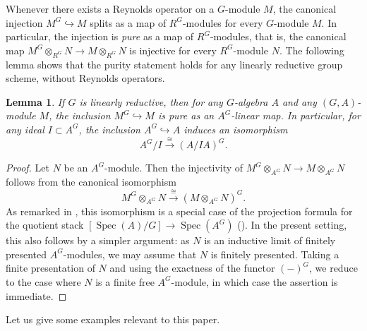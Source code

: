\documentclass[uplatex,11pt,a4paper]{amsart} %
\numberwithin{equation}{section}
\numberwithin{figure}{section}
\numberwithin{table}{section}
\theoremstyle{plain}
\newtheorem{lemma}[theorem]{Lemma}
\theoremstyle{definition}
\newcommand{\xr}{\xrightarrow}
\DeclareMathOperator{\Spec}{Spec}
\begin{document}
Whenever there exists a Reynolds operator on a $G$-module $M$, the canonical injection $M^G\hookrightarrow M$ splits as a map of $R^G$-modules for every $G$-module $M$. In particular, the injection is \emph{pure} as a map of $R^G$-modules, that is, the canonical map $M^G\otimes_{R^G}N\longrightarrow M\otimes_{R^G}N$ is injective for every $R^G$-module $N$.
The following lemma shows that the purity statement holds for any linearly reductive group scheme, without Reynolds operators.

\begin{lemma}
\label{lem:AGpure}
If $G$ is linearly reductive, then for any $G$-algebra $A$ and any $(G,A)$-module $M$, the inclusion $M^G\hookrightarrow M$ is pure as an $A^G$-linear map. In particular, for any ideal $I\subset A^G$, the inclusion $A^G\hookrightarrow A$ induces an isomorphism
\[
A^G/I\xr{\cong} (A/IA)^G.
\]
\end{lemma}

\begin{proof}
Let $N$ be an $A^G$-module. Then the injectivity of $M^G\otimes_{A^G}N\to M\otimes_{A^G}N$ follows from the canonical isomorphism
\[
M^G\otimes_{A^G}N \xr{\cong}(M\otimes_{A^G}N)^G.
\]
As remarked in \cite[Remark 4.8]{Alp13}, this isomorphism is a special case of the projection formula for the quotient stack $[\Spec(A)/G]\to\Spec(A^G)$ (\cite[Proposition 4.7]{Alp13}). In the present setting, this also follows by a simpler argument: as $N$ is an inductive limit of finitely presented $A^G$-modules, we may assume that $N$ is finitely presented. Taking a finite presentation of $N$ and using the exactness of the functor $(-)^G$, we reduce to the case where $N$ is a finite free $A^G$-module, in which case the assertion is immediate.
\end{proof}

Let us give some examples relevant to this paper.
\end{document}
